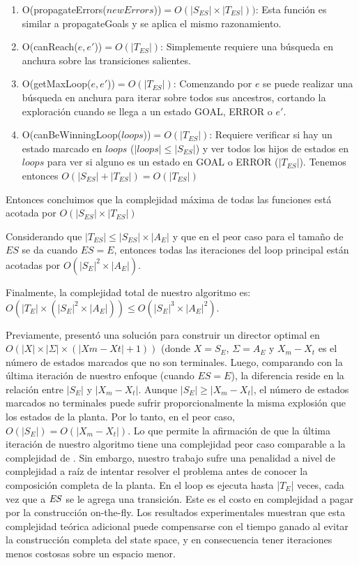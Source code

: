 \begin{enumerate}
	\item O(propagateErrors($newErrors$))$ = O(|S_{ES}| \times |T_{ES}|))$: Esta función es similar a propagateGoals y se aplica el mismo razonamiento.	
	
	\item O(canReach($e, e'$))$ = O(|T_{ES}|)$: Simplemente requiere una búsqueda en anchura sobre las transiciones salientes.
	
	\item O(getMaxLoop($e, e'$))$ = O(|T_{ES}|)$: 
	Comenzando por $e$ se puede realizar una búsqueda en anchura para iterar sobre todos sus ancestros, cortando la exploración cuando se llega a un estado GOAL, ERROR o $e'$. 
	
	
	\item O(canBeWinningLoop($loops$))$ = O(|T_{ES}|)$: Requiere verificar si hay un estado marcado en $loops$ ($|loops| \leq |S_{ES}|$) y ver todos los hijos de estados en $loops$ para ver si alguno es un estado en GOAL o ERROR ($|T_{ES}|$).  
	Tenemos entonces $O(|S_{ES}| + |T_{ES}|) = O(|T_{ES}|)$
	
\end{enumerate}

Entonces concluimos que la complejidad máxima de todas las funciones está acotada por $O(|S_{ES}| \times |T_{ES}|)$  

Considerando que $|T_{ES}| \leq|S_{ES}|\times|A_E|$ y que en el peor caso para el tamaño de $ES$ se da cuando $ES=E$, entonces todas las iteraciones del loop principal están acotadas por $O(|S_E|^2\times|A_E|)$.

Finalmente, la complejidad total de nuestro algoritmo es: $O(|T_E| \times (|S_E|^2 \times |A_E|)) \leq O(|S_E|^3 \times |A_E|^2)$.

Previamente, \cite{Huang:2007:Optimal}
presentó una solución para construir un director optimal en $O(|X| \times |\Sigma| × (|X m − X t | + 1))$ (donde $X=S_E$, $\Sigma = A_E$ y $X_m - X_t$ es el número de 
estados marcados que no son terminales. 
Luego, comparando \cite{Huang:2007:Optimal} 
con la última iteración de nuestro enfoque (cuando $ES=E$), la diferencia reside en la relación entre
$|S_E|$ y $|X_m - X_t|$. 
Aunque $|S_E| \geq |X_m - X_t|$, el número de estados marcados no terminales puede sufrir proporcionalmente la misma explosión que los estados de la planta.
Por lo tanto, en el peor caso, $O(|S_E|) = O(|X_m - X_t|)$. Lo que permite la afirmación de que la última iteración de nuestro algoritmo tiene una complejidad peor caso comparable a la complejidad de 
\cite{Huang:2007:Optimal}.
Sin embargo, nuestro trabajo sufre una penalidad a nivel de complejidad a raíz de intentar resolver el problema antes de conocer la composición completa de la planta. En \DCS el loop es ejecuta hasta
|$T_E$| veces, cada vez que a $\mathit{ES}$ se le agrega una transición. Este es el costo en complejidad a pagar por la construcción on-the-fly. 
Los resultados experimentales muestran que esta complejidad teórica adicional puede compensarse con el tiempo ganado al evitar la construcción completa del state space, y en consecuencia tener iteraciones menos costosas sobre un espacio menor. 







